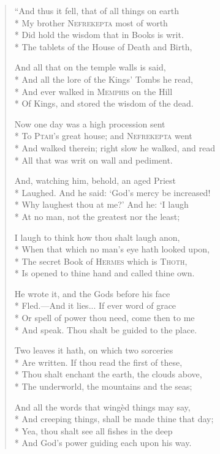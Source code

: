 \documentclass[12pt]{article}
\newcommand{\vin}{\hspace{1em}}
\begin{document}
\begin{verse}
``And thus it fell, that of all things on earth\\*
My brother \textsc{Nefrekepta} most of worth\\*
\vin Did hold the wisdom that in Books is writ.\\*
The tablets of the House of Death and Birth,

And all that on the temple walls is said,\\*
And all the lore of the Kings' Tombs he read,\\*
\vin And ever walked in \textsc{Memphis} on the Hill\\*
Of Kings, and stored the wisdom of the dead.

Now one day was a high procession sent\\*
To \textsc{Ptah}'s great house; and \textsc{Nefrekepta} went\\*
\vin And walked therein; right slow he walked, and read\\*
All that was writ on wall and pediment.

And, watching him, behold, an aged Priest\\*
Laughed. And he said: `God's mercy be increased!\\*
\vin Why laughest thou at me?' And he: `I laugh\\*
At no man, not the greatest nor the least;

I laugh to think how thou shalt laugh anon,\\*
When that which no man's eye hath looked upon,\\*
\vin The secret Book of \textsc{Hermes} which is \textsc{Thoth},\\*
Is opened to thine hand and called thine own.

He wrote it, and the Gods before his face\\*
Fled.---And it lies... If ever word of grace\\*
\vin Or spell of power thou need, come then to me\\*
And speak. Thou shalt be guided to the place.

Two leaves it hath, on which two sorceries\\*
Are written. If thou read the first of these,\\*
\vin Thou shalt enchant the earth, the clouds above,\\*
The underworld, the mountains and the seas;

And all the words that wing\`{e}d things may say,\\*
And creeping things, shall be made thine that day;\\*
\vin Yea, thou shalt see all fishes in the deep\\*
And God's power guiding each upon his way.


\end{verse}
\end{document}
